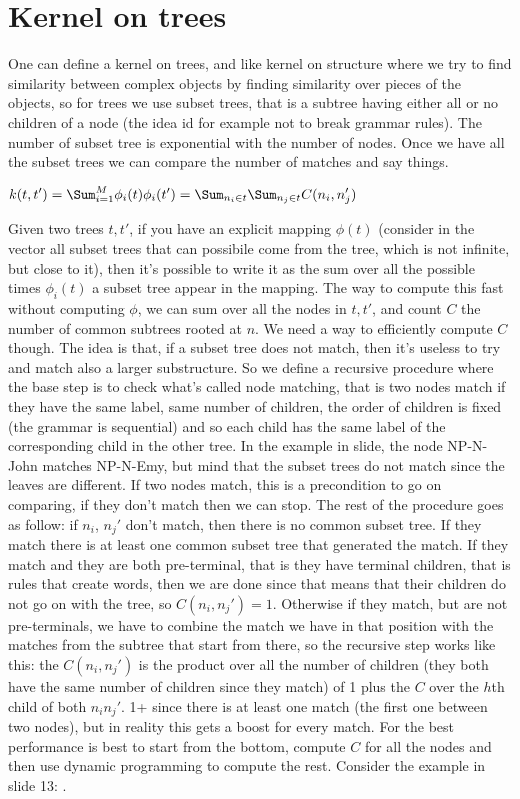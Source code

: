 \section{Kernel on trees}
One can define a kernel on trees, and like kernel on structure where we try to find similarity between complex objects by finding similarity over pieces of the objects, so for trees we use subset trees, that is a subtree having either all or no children of a node (the idea id for example not to break grammar rules). The number of subset tree is exponential with the number of nodes. Once we have all the subset trees we can compare the number of matches and say things. \newline
\begin{center}
	$\displaystyle k(t, t')=\Sum_{i=1}^M\phi_i(t)\phi_i(t')=\Sum_{n_i\in t}\Sum_{n_j\in t}C(n_i, n'_j)$
\end{center}
Given two trees $t, t'$, if you have an explicit mapping $\phi(t)$ (consider in the vector all subset trees that can possibile come from the tree, which is not infinite, but close to it), then it's possible to write it as the sum over all the possible times $\phi_i(t)$ a subset tree appear in the mapping.\newline
The way to compute this fast without computing $\phi$, we can sum over all the nodes in $t, t'$, and count $C$ the number of common subtrees rooted at $n$. We need a way to efficiently compute $C$ though. The idea is that, if a subset tree does not match, then it's useless to try and match also a larger substructure. So we define a recursive procedure where the base step is to check what's called node matching, that is two nodes match if they have the same label, same number of children, the order of children is fixed (the grammar is sequential) and so each child has the same label of the corresponding child in the other tree. In the example in slide, the node NP-N-John matches NP-N-Emy, but mind that the subset trees do not match since the leaves are different. If two nodes match, this is a precondition to go on comparing, if they don't match then we can stop. The rest of the procedure goes as follow: if $n_i$, $n_j'$ don't match, then there is no common subset tree. If they match there is at least one common subset tree that generated the match. If they match and they are both pre-terminal, that is they have terminal children, that is rules that create words, then we are done since that means that their children do not go on with the tree, so $C(n_i,n_j')=1$. Otherwise if they match, but are not pre-terminals, we have to combine the match we have in that position with the matches from the subtree that start from there, so the recursive step works like this: the $C(n_i, n_j')$ is the product over all the number of children (they both have the same number of children since they match) of 1 plus the $C$ over the $h$th child of both $n_i n_j'$. 1+ since there is at least one match (the first one between two nodes), but in reality this gets a boost for every match. \newline
For the best performance is best to start from the bottom, compute $C$ for all the nodes and then use dynamic programming to compute the rest. Consider the example in slide 13: . \newline
